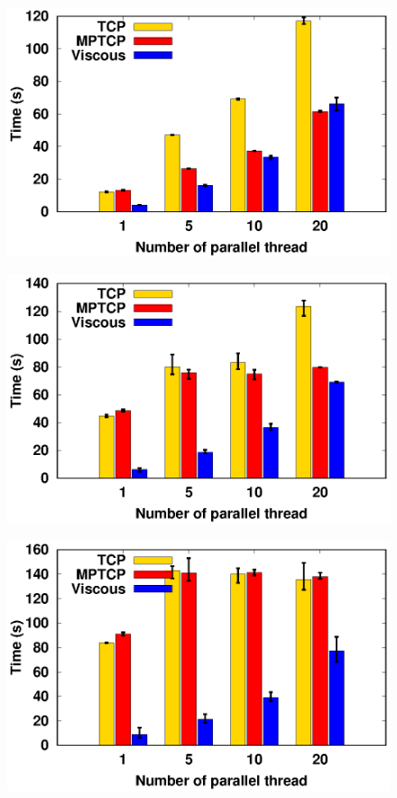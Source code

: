 \begin{figure}[!t]
	\begin{center}
		\begin{minipage}{0.45\linewidth}
			\centering
			\includegraphics[width=\linewidth]{img/exp7/time_elapsed_1}
			\label{fig:exp7_time_16}
		\end{minipage}
		\begin{minipage}{0.45\linewidth}
			\centering
			\includegraphics[width=\linewidth]{img/exp7/time_elapsed_5}
			\label{fig:exp7_time_80}
		\end{minipage}
		\begin{minipage}{0.45\linewidth}
			\centering
			\includegraphics[width=\linewidth]{img/exp7/time_elapsed_10}

\end{minipage}
\end{center}
\end{figure}
